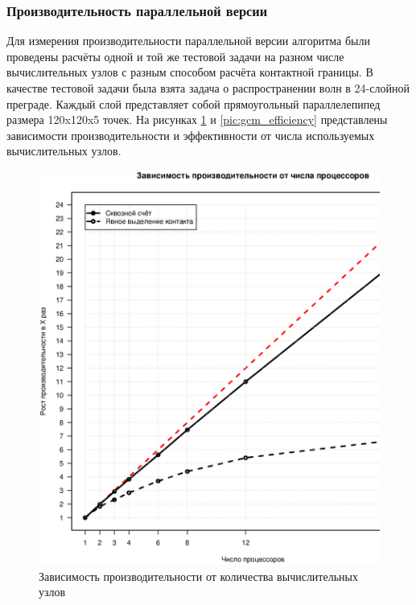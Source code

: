 \subsubsection{Производительность параллельной версии}
Для измерения производительности параллельной версии алгоритма были проведены
расчёты одной и той же тестовой задачи на разном числе вычислительных узлов с
разным способом расчёта контактной границы. В
качестве тестовой задачи была взята задача о распространении волн в 24-слойной
преграде. Каждый слой представляет собой прямоугольный параллелепипед размера
120x120x5 точек. На рисунках \ref{pic:gcm_boost} и
\ref{pic:gcm_efficiency} представлены зависимости производительности и
эффективности от числа используемых вычислительных узлов.
\begin{figure}[htp]
\centering
\includegraphics[width=\textwidth]{eps/gcm3d-boost.eps}
\caption{Зависимость производительности от количества вычислительных узлов}
\label{pic:gcm_boost}
\end{figure}
